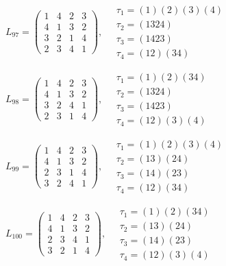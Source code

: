 $L_{97} = \begin{pmatrix} 1 & 4 & 2 & 3 \\ 4 & 1 & 3 & 2 \\ 3 & 2 & 1 & 4 \\ 2 & 3 & 4 & 1 \end{pmatrix}, \quad \begin{matrix} \tau_{1} = (1)(2)(3)(4) \\ \tau_{2} = (1 3 2 4) \\ \tau_{3} = (1 4 2 3) \\ \tau_{4} = (1 2)(3 4) \end{matrix}$

$L_{98} = \begin{pmatrix} 1 & 4 & 2 & 3 \\ 4 & 1 & 3 & 2 \\ 3 & 2 & 4 & 1 \\ 2 & 3 & 1 & 4 \end{pmatrix}, \quad \begin{matrix} \tau_{1} = (1)(2)(3 4) \\ \tau_{2} = (1 3 2 4) \\ \tau_{3} = (1 4 2 3) \\ \tau_{4} = (1 2)(3)(4) \end{matrix}$

$L_{99} = \begin{pmatrix} 1 & 4 & 2 & 3 \\ 4 & 1 & 3 & 2 \\ 2 & 3 & 1 & 4 \\ 3 & 2 & 4 & 1 \end{pmatrix}, \quad \begin{matrix} \tau_{1} = (1)(2)(3)(4) \\ \tau_{2} = (1 3)(2 4) \\ \tau_{3} = (1 4)(2 3) \\ \tau_{4} = (1 2)(3 4) \end{matrix}$

$L_{100} = \begin{pmatrix} 1 & 4 & 2 & 3 \\ 4 & 1 & 3 & 2 \\ 2 & 3 & 4 & 1 \\ 3 & 2 & 1 & 4 \end{pmatrix}, \quad \begin{matrix} \tau_{1} = (1)(2)(3 4) \\ \tau_{2} = (1 3)(2 4) \\ \tau_{3} = (1 4)(2 3) \\ \tau_{4} = (1 2)(3)(4) \end{matrix}$

